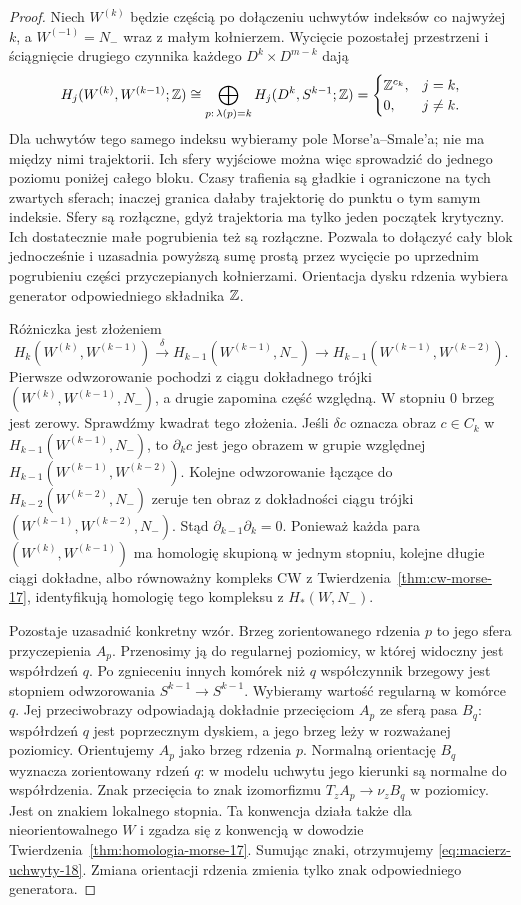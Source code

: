 \begin{proof}
Niech $W^{(k)}$ będzie częścią po dołączeniu
uchwytów indeksów co najwyżej $k$,
a $W^{(-1)}=N_-$ wraz z małym kołnierzem.
Wycięcie pozostałej przestrzeni i
ściągnięcie drugiego czynnika każdego
$D^k\times D^{m-k}$ dają
\[
 H_j(W^{(k)},W^{(k-1)};\mathbb{Z})
 \cong
 \bigoplus_{p:\,\lambda(p)=k}
 H_j(D^k,S^{k-1};\mathbb{Z})
 =
 \begin{cases}
 \mathbb{Z}^{c_k},&j=k,\\
 0,&j\ne k.
 \end{cases}
\]
Dla uchwytów tego samego indeksu wybieramy pole
Morse'a--Smale'a; nie ma między nimi trajektorii.
Ich sfery wyjściowe można więc sprowadzić do jednego
poziomu poniżej całego bloku. Czasy trafienia są
gładkie i ograniczone na tych zwartych sferach;
inaczej granica dałaby trajektorię do punktu
o tym samym indeksie. Sfery są rozłączne, gdyż
trajektoria ma tylko jeden początek krytyczny.
Ich dostatecznie małe pogrubienia też są rozłączne.
Pozwala to dołączyć cały blok jednocześnie
i uzasadnia powyższą sumę prostą przez wycięcie
po uprzednim pogrubieniu części przyczepianych kołnierzami.
Orientacja dysku rdzenia wybiera generator
odpowiedniego składnika $\mathbb{Z}$.

Różniczka jest złożeniem
\[
 H_k(W^{(k)},W^{(k-1)})
 \xrightarrow{\delta}H_{k-1}(W^{(k-1)},N_-)
 \longrightarrow H_{k-1}(W^{(k-1)},W^{(k-2)}).
\]
Pierwsze odwzorowanie pochodzi z ciągu dokładnego trójki
$(W^{(k)},W^{(k-1)},N_-)$, a drugie zapomina
część względną. W stopniu $0$ brzeg jest zerowy.
Sprawdźmy kwadrat tego złożenia. Jeśli $\delta c$ oznacza
obraz $c\in C_k$ w $H_{k-1}(W^{(k-1)},N_-)$, to
$\partial_k c$ jest jego obrazem w grupie względnej
$H_{k-1}(W^{(k-1)},W^{(k-2)})$. Kolejne odwzorowanie łączące
do $H_{k-2}(W^{(k-2)},N_-)$ zeruje ten obraz z dokładności
ciągu trójki $(W^{(k-1)},W^{(k-2)},N_-)$. Stąd
$\partial_{k-1}\partial_k=0$. Ponieważ każda para
$(W^{(k)},W^{(k-1)})$ ma homologię
skupioną w jednym stopniu, kolejne
długie ciągi dokładne, albo równoważny
kompleks CW z
Twierdzenia~\ref{thm:cw-morse-17},
identyfikują homologię tego kompleksu
z $H_*(W,N_-)$.

Pozostaje uzasadnić konkretny wzór.
Brzeg zorientowanego rdzenia $p$
to jego sfera przyczepienia $A_p$.
Przenosimy ją do regularnej poziomicy,
w której widoczny jest współrdzeń $q$.
Po zgnieceniu innych komórek niż $q$
współczynnik brzegowy jest stopniem
odwzorowania
$S^{k-1}\to S^{k-1}$.
Wybieramy wartość regularną w komórce $q$.
Jej przeciwobrazy odpowiadają dokładnie
przecięciom $A_p$ ze sferą pasa $B_q$:
współrdzeń $q$ jest poprzecznym dyskiem,
a jego brzeg leży w rozważanej poziomicy.
Orientujemy $A_p$ jako brzeg rdzenia $p$.
Normalną orientację $B_q$ wyznacza zorientowany
rdzeń $q$: w modelu uchwytu jego kierunki są
normalne do współrdzenia. Znak przecięcia to znak
izomorfizmu $T_zA_p\to\nu_z B_q$ w poziomicy.
Jest on znakiem lokalnego stopnia. Ta konwencja
działa także dla nieorientowalnego $W$ i zgadza się
z konwencją w dowodzie
Twierdzenia~\ref{thm:homologia-morse-17}.
Sumując znaki, otrzymujemy
\eqref{eq:macierz-uchwyty-18}.
Zmiana orientacji rdzenia zmienia tylko
znak odpowiedniego generatora.
\end{proof}

